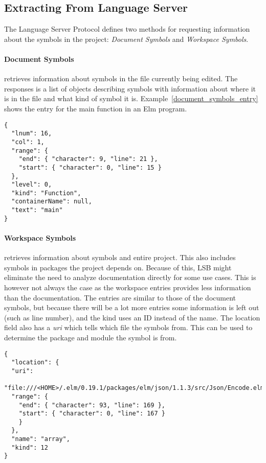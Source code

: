 \documentclass[../thesis.tex]{subfiles}
\begin{document}
\subsection{Extracting From Language Server}%
The Language Server Protocol defines two methods for requesting information about the symbols in the project: \textit{Document Symbols} and \textit{Workspace Symbols}.

\paragraph{Document Symbols} retrieves information about symbols in the file currently being edited.
The responses is a list of objects describing symbols with information about where it is in the file
and what kind of symbol it is. Example~\ref{document_symbols_entry} shows the entry for the main function in an Elm program.
\begin{example}\label{document_symbols_entry}
\begin{verbatim}
{
  "lnum": 16,
  "col": 1,
  "range": {
    "end": { "character": 9, "line": 21 },
    "start": { "character": 0, "line": 15 }
  },
  "level": 0,
  "kind": "Function",
  "containerName": null,
  "text": "main"
} 
\end{verbatim}
\end{example}

\paragraph{Workspace Symbols} retrieves information about symbols and entire project.
This also includes symbols in packages the project depends on.
Because of this, LSB might eliminate the need to analyze documentation directly for some use cases.
This is however not always the case as the workspace entries provides less information than the documentation.
The entries are similar to those of the document symbols, but because there will be a lot more entries some
information is left out (such as line number), and the kind uses an ID instead of the name.
The location field also has a \textit{uri} which tells which file the symbols from.
This can be used to determine the package and module the symbol is from.
\begin{example}
\begin{verbatim}
{ 
  "location": {
  "uri":
    "file:///<HOME>/.elm/0.19.1/packages/elm/json/1.1.3/src/Json/Encode.elm",
  "range": {
    "end": { "character": 93, "line": 169 },
    "start": { "character": 0, "line": 167 }
    }
  },
  "name": "array",
  "kind": 12 
}
\end{verbatim} 
\end{example}
\end{document}
